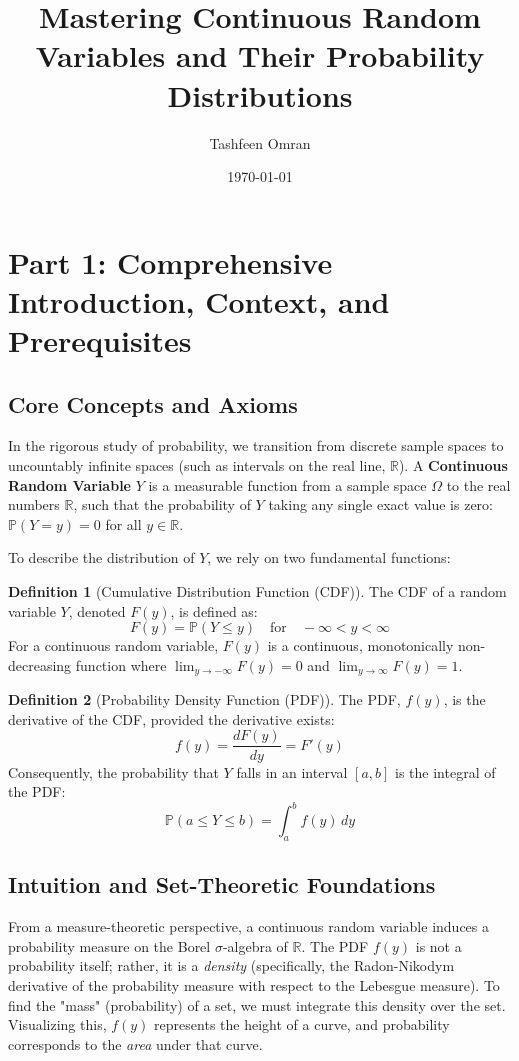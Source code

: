 \documentclass[11pt, a4paper]{article}
\title{\textbf{Mastering Continuous Random Variables and Their Probability Distributions}}
\author{Tashfeen Omran}
\date{\today}
\theoremstyle{definition}
\newtheorem{definition}{Definition}[section]
\theoremstyle{remark}
\newcommand{\R}{\mathbb{R}}
\newcommand{\Prob}{\mathbb{P}}
\begin{document}
\maketitle
\tableofcontents
\newpage

\section{Part 1: Comprehensive Introduction, Context, and Prerequisites}

\subsection{Core Concepts and Axioms}
In the rigorous study of probability, we transition from discrete sample spaces to uncountably infinite spaces (such as intervals on the real line, $\R$). A \textbf{Continuous Random Variable} $Y$ is a measurable function from a sample space $\Omega$ to the real numbers $\R$, such that the probability of $Y$ taking any single exact value is zero: $\Prob(Y = y) = 0$ for all $y \in \R$. 

To describe the distribution of $Y$, we rely on two fundamental functions:
\begin{definition}[Cumulative Distribution Function (CDF)]
The CDF of a random variable $Y$, denoted $F(y)$, is defined as:
\[ F(y) = \Prob(Y \le y) \quad \text{for} \quad -\infty < y < \infty \]
For a continuous random variable, $F(y)$ is a continuous, monotonically non-decreasing function where $\lim_{y \to -\infty} F(y) = 0$ and $\lim_{y \to \infty} F(y) = 1$.
\end{definition}

\begin{definition}[Probability Density Function (PDF)]
The PDF, $f(y)$, is the derivative of the CDF, provided the derivative exists:
\[ f(y) = \frac{dF(y)}{dy} = F'(y) \]
Consequently, the probability that $Y$ falls in an interval $[a, b]$ is the integral of the PDF:
\[ \Prob(a \le Y \le b) = \int_{a}^{b} f(y) \, dy \]
\end{definition}

\subsection{Intuition and Set-Theoretic Foundations}
From a measure-theoretic perspective, a continuous random variable induces a probability measure on the Borel $\sigma$-algebra of $\R$. The PDF $f(y)$ is not a probability itself; rather, it is a \textit{density} (specifically, the Radon-Nikodym derivative of the probability measure with respect to the Lebesgue measure). To find the "mass" (probability) of a set, we must integrate this density over the set. Visualizing this, $f(y)$ represents the height of a curve, and probability corresponds to the \textit{area} under that curve.
\end{document}
